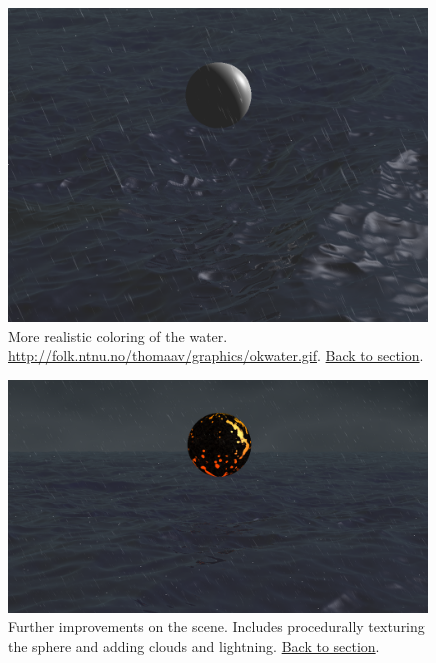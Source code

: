 \documentclass[abstract=off,oneside]{scrreprt}
\begin{document}
\begin{figure}[htb]
\centering
\includegraphics[width=0.99\textwidth]{./img/okwater.png}
\caption*{\label{fig:okwater}More realistic coloring of the water. \url{http://folk.ntnu.no/thomaav/graphics/okwater.gif}. \hyperref[sec:realisticcolor]{Back to section}.}
\end{figure}

\begin{figure}[htb]
\centering
\includegraphics[width=0.99\textwidth]{./img/improvements.png}
\caption*{\label{fig:improvements}Further improvements on the scene. Includes procedurally texturing the sphere and adding clouds and lightning. \hyperref[sec:furtherimprovements]{Back to section}.}
\end{figure}
\end{document}
